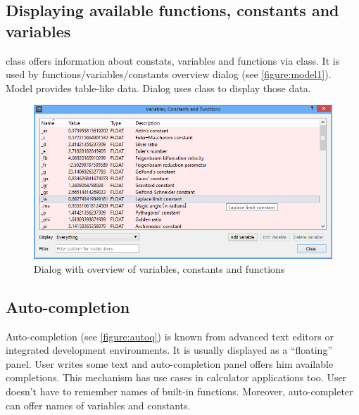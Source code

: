 \subsection{Displaying available functions, constants and variables}\label{chap:guii}
 class offers information about constats, variables and functions via class. It is used by functions/variables/constants overview dialog (see \autoref{figure:model1}). Model provides table-like data. Dialog uses class to display those data.

\begin{figure}[ht]
\centering
\includegraphics[width=13cm]{graphics/real-world/07-model1.png}
\caption{Dialog with overview of variables, constants and functions}\label{figure:model1}
\end{figure}

\subsection{Auto-completion}
Auto-completion (see \autoref{figure:autoq}) is known from advanced text editors or integrated development environments. It is usually displayed as a \enquote{floating} panel. User writes some text and auto-completion panel offers him available completions. This mechanism has use cases in calculator applications too. User doesn't have to remember names of built-in functions. Moreover, auto-completer can offer names of variables and constants.

